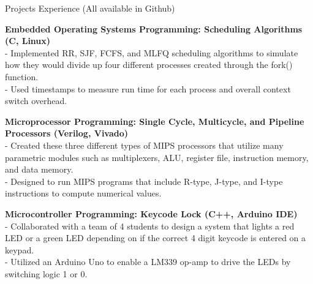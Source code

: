 \documentclass{resume} %
\begin{document}
\begin{rSection}{Projects Experience (All available in Github)}

{\bf Embedded Operating Systems Programming: Scheduling Algorithms (C, Linux)
}
\\- Implemented RR, SJF, FCFS, and MLFQ scheduling algorithms to simulate how they would divide up four different \hspace*{0.5em}processes created through the fork() function.
\\- Used timestamps to measure run time for each process and overall context switch overhead.

{\bf Microprocessor Programming: Single Cycle, Multicycle, and Pipeline Processors (Verilog, Vivado)}
\\- Created these three different types of MIPS processors that utilize many parametric modules such as multiplexers, \hspace*{0.5em}ALU, register file, instruction memory, and data memory.
\\- Designed to run MIPS programs that include R-type, J-type, and I-type instructions to compute numerical values.

{\bf Microcontroller Programming: Keycode Lock (C++, Arduino IDE) }
\\- Collaborated with a team of 4 students to design a system that lights a red LED or a green LED depending on if the \hspace*{0.5em}correct 4 digit keycode is entered on a keypad.
\\- Utilized an Arduino Uno to enable a LM339 op-amp to drive the LEDs by switching logic 1 or 0.   




\end{rSection}
\end{document}
